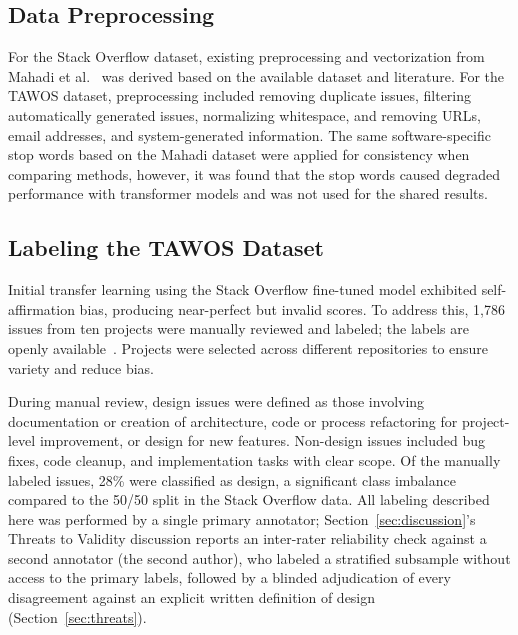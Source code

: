 \documentclass[preprint,12pt]{elsarticle}
\begin{document}
\subsection{Data Preprocessing}

For the Stack Overflow dataset, existing preprocessing and vectorization from Mahadi et al.~\cite{mahadi2021} was derived based on the available dataset and literature. For the TAWOS dataset, preprocessing included removing duplicate issues, filtering automatically generated issues, normalizing whitespace, and removing URLs, email addresses, and system-generated information. The same software-specific stop words based on the Mahadi dataset were applied for consistency when comparing methods, however, it was found that the stop words caused degraded performance with transformer models and was not used for the shared results.

\subsection{Labeling the TAWOS Dataset}
\label{sec:labeling}

Initial transfer learning using the Stack Overflow fine-tuned model exhibited self-affirmation bias, producing near-perfect but invalid scores. To address this, 1,786 issues from ten projects were manually reviewed and labeled; the labels are openly available~\cite{morgan2026dataset}. Projects were selected across different repositories to ensure variety and reduce bias.

During manual review, design issues were defined as those involving documentation or creation of architecture, code or process refactoring for project-level improvement, or design for new features. Non-design issues included bug fixes, code cleanup, and implementation tasks with clear scope. Of the manually labeled issues, 28\% were classified as design, a significant class imbalance compared to the 50/50 split in the Stack Overflow data. All labeling described here was performed by a single primary annotator; Section~\ref{sec:discussion}'s Threats to Validity discussion reports an inter-rater reliability check against a second annotator (the second author), who labeled a stratified subsample without access to the primary labels, followed by a blinded adjudication of every disagreement against an explicit written definition of design (Section~\ref{sec:threats}).
\end{document}
